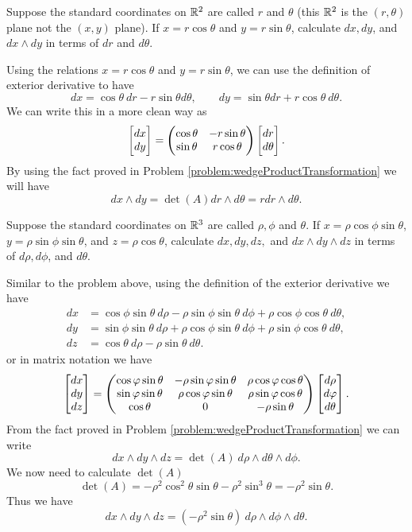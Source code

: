 \begin{problem}
	Suppose the standard coordinates on $ \mathbb{R}^2 $ are called $ r $ and $ \theta $ (this $ \mathbb{R}^2 $ is the $ (r,\theta) $ plane not the $ (x,y) $ plane). If $ x = r\cos\theta $ and $ y = r\sin\theta $, calculate $ dx, dy $, and $ dx\wedge dy $ in terms of $ dr $ and $ d\theta $.
\end{problem}
\begin{solution}
	Using the relations $ x = r\cos\theta $ and $ y = r \sin\theta $, we can use the definition of exterior derivative to have
	\[ dx = \cos\theta\ dr - r\sin\theta d\theta, \qquad dy = \sin\theta dr + r\cos\theta\ d\theta. \]
	We can write this in a more clean way as
	\[ \begin{bmatrix} dx \\ dy \end{bmatrix} = \begin{pmatrix} \cos\theta & -r\sin\theta \\ \sin\theta & r\cos\theta \end{pmatrix}\begin{bmatrix} dr \\ d\theta \end{bmatrix}. \]
	By using the fact proved in Problem \autoref{problem:wedgeProductTransformation} we will have
	\[ dx \wedge dy = \det(A) dr\wedge d\theta = r dr\wedge d\theta. \]
\end{solution}

\begin{problem}
	Suppose the standard coordinates on $ \mathbb{R}^3 $ are called $ \rho,\phi $ and $ \theta $. If $ x = \rho\cos\phi\sin\theta $, $ y = \rho\sin\phi\sin\theta $, and $ z = \rho\cos\theta $, calculate $ dx, dy, dz, $ and $ dx\wedge dy\wedge dz $ in terms of $ d\rho,d\phi $, and $ d\theta $.
\end{problem}

\begin{solution}
	Similar to the problem above, using the definition of the exterior derivative we have
	\begin{align*}
		dx &= \cos\phi\sin\theta\ d\rho - \rho\sin\phi\sin\theta\ d\phi +  \rho\cos\phi\cos\theta\ d\theta ,\\
		dy &= \sin\phi\sin\theta\ d\rho + \rho\cos\phi\sin\theta\ d\phi + \rho\sin\phi\cos\theta\ d\theta,\\
		dz &= \cos\theta\ d\rho - \rho\sin\theta\ d\theta.
	\end{align*}
	or in matrix notation we have
	\[ \begin{bmatrix} dx \\ dy \\ dz \end{bmatrix} = 
	\begin{pmatrix}
		\cos\varphi\sin\theta & -\rho\sin\varphi\sin\theta & \rho\cos\varphi\cos\theta \\
		\sin\varphi\sin\theta & \rho\cos\varphi\sin\theta & \rho\sin\varphi\cos\theta \\
		\cos\theta & 0 & -\rho\sin\theta
	\end{pmatrix}
	\begin{bmatrix} d\rho \\ d\varphi \\ d\theta \end{bmatrix}.
	 \]
	 From the fact proved in Problem \autoref{problem:wedgeProductTransformation} we can write
	 \[ dx\wedge dy \wedge dz = \det(A)\ d\rho \wedge d\theta \wedge d\phi. \]
	 We now need to calculate $ \det(A) $
	 \[ \det(A) = -\rho^2\cos^2\theta\sin\theta - \rho^2\sin^3\theta = -\rho^2\sin\theta.  \]
	 Thus we have
	 \[ dx \wedge dy \wedge dz = (-\rho^2 \sin\theta )\ d\rho \wedge d\phi \wedge d\theta. \]
\end{solution}

